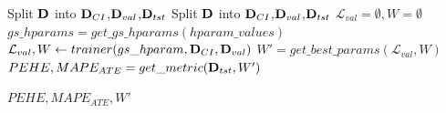 \documentclass[twoside,11pt]{article}
\begin{document}
\begin{algorithm}
 \caption{\texttt{Hi-CI}} 
\label{alg:HiCI}
\begin{algorithmic}[1]
\State Split $\mathbf{D}$ into $\mathbf{D}_{CI}$,$\mathbf{D}_{val}$,$\mathbf{D}_{tst}$ 
    \State Split $\mathbf{D}$ into $\mathbf{D}_{CI}$,$\mathbf{D}_{val}$,$\mathbf{D}_{tst}$
\EndWhile
\State $\mathcal{L}_{val} = \emptyset, W = \emptyset$%
\State $gs\_hparams = get\_gs\_hparams(hparam\_values)$\
    \State $\mathcal{L}_{val}, W \gets trainer(gs\_hparam, \mathbf{D}_{CI}, \mathbf{D}_{val})$
\EndFor
\State $W' = get\_best\_params(\mathcal{L}_{val}, W)$
\State $PEHE, MAPE_{ATE} = get\_metric(\mathbf{D}_{tst}, W')$ \par
\Return $PEHE, MAPE_{ATE}, W'$
\EndProcedure
\end{algorithmic}
\end{algorithm}
\end{document}
